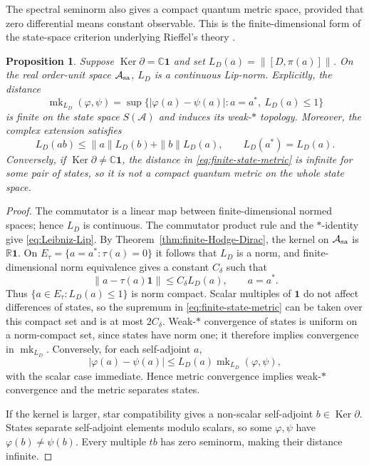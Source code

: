\documentclass[11pt]{article}
\newtheorem{proposition}[proposition]{Proposition}
\theoremstyle{definition}
\theoremstyle{remark}
\theoremstyle{definition}
\theoremstyle{remark}
\newcommand{\R}{\mathbb R}
\newcommand{\C}{\mathbb C}
\newcommand{\one}{\mathbf 1}
\newcommand{\Ker}{\operatorname{Ker}}
\newcommand{\A}{\mathcal A}
\begin{document}
The spectral seminorm also gives a compact quantum metric space, provided that
zero differential means constant observable.  This is the finite-dimensional
form of the state-space criterion underlying Rieffel's theory
\cite{Rieffel1998,Rieffel1999}.

\begin{proposition}
\label{prop:finite-CQMS}
Suppose $\Ker\partial=\C\one$ and set
$L_D(a)=\|[D,\pi(a)]\|$.  On the real order-unit space $\A_{\rm sa}$,
$L_D$ is a continuous Lip-norm.  Explicitly, the distance
\begin{equation}
 \operatorname{mk}_{L_D}(\varphi,\psi)
 =\sup\{|\varphi(a)-\psi(a)|:
          a=a^*,\ L_D(a)\le1\}
 \label{eq:finite-state-metric}
\end{equation}
is finite on the state space $S(\A)$ and induces its weak-$*$ topology.
Moreover, the complex extension satisfies
\begin{equation}
 L_D(ab)\le\|a\|L_D(b)+\|b\|L_D(a),\qquad
 L_D(a^*)=L_D(a).
 \label{eq:Leibniz-Lip}
\end{equation}
Conversely, if $\Ker\partial\ne\C\one$, the distance in
\eqref{eq:finite-state-metric} is infinite for some pair of states, so it is
not a compact quantum metric on the whole state space.
\end{proposition}

\begin{proof}
The commutator is a linear map between finite-dimensional normed spaces;
hence $L_D$ is continuous.  The commutator product rule and the $*$-identity
give \eqref{eq:Leibniz-Lip}.  By Theorem~\ref{thm:finite-Hodge-Dirac},
the kernel on $\A_{\rm sa}$ is $\R\one$.
On $E_\tau=\{a=a^*:\tau(a)=0\}$ it follows that $L_D$ is a norm, and
finite-dimensional norm equivalence gives a constant $C_\delta$ such that
\begin{equation}
 \|a-\tau(a)\one\|\le C_\delta L_D(a),\qquad a=a^*.
 \label{eq:finite-Poincare-Lip}
\end{equation}
Thus $\{a\in E_\tau:L_D(a)\le1\}$ is norm compact.  Scalar multiples of
$\one$ do not affect differences of states, so the supremum in
\eqref{eq:finite-state-metric} can be taken over this compact set and is at
most $2C_\delta$.  Weak-$*$ convergence of states is uniform on a norm-compact
set, since states have norm one; it therefore implies convergence in
$\operatorname{mk}_{L_D}$.  Conversely, for each self-adjoint $a$,
\[
 |\varphi(a)-\psi(a)|\le L_D(a)
       \operatorname{mk}_{L_D}(\varphi,\psi),
\]
with the scalar case immediate.  Hence metric convergence implies weak-$*$
convergence and the metric separates states.

If the kernel is larger, star compatibility gives a non-scalar self-adjoint
$b\in\Ker\partial$.  States separate self-adjoint elements modulo scalars,
so some $\varphi,\psi$ have $\varphi(b)\ne\psi(b)$.  Every multiple $tb$
has zero seminorm, making their distance infinite.
\end{proof}
\end{document}
